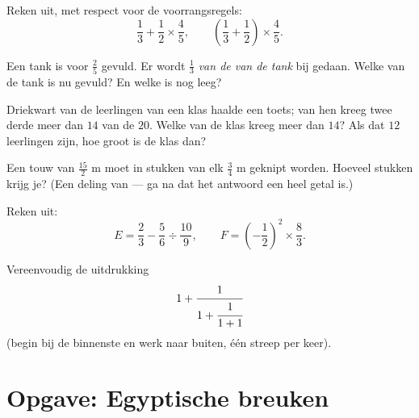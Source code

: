 \begin{exercise}[$\star$]\label{exo:g8:fractions:7}
Reken uit, met respect voor de voorrangsregels:
\[
\frac{1}{3} + \frac{1}{2} \times \frac{4}{5},
\qquad
\left(\frac{1}{3} + \frac{1}{2}\right) \times \frac{4}{5} .
\]
\end{exercise}

\begin{exercise}[$\star\star$]\label{exo:g8:fractions:8}
Een tank is voor $\frac{2}{5}$ gevuld. Er wordt $\frac{1}{3}$ \emph{van de  van
de tank} bij gedaan. Welke  van de tank is nu gevuld? En welke  is nog
leeg?
\end{exercise}

\begin{exercise}[$\star\star$]\label{exo:g8:fractions:9}
Driekwart van de leerlingen van een klas haalde een toets; van hen kreeg twee derde
meer dan $14$ van de $20$. Welke  van de klas kreeg meer dan $14$? Als dat $12$
leerlingen zijn, hoe groot is de klas dan?
\end{exercise}

\begin{exercise}[$\star\star$]\label{exo:g8:fractions:10}
Een touw van $\frac{15}{2}$ m moet in stukken van elk $\frac{3}{4}$ m geknipt worden.
Hoeveel stukken krijg je? (Een deling van  --- ga na dat het antwoord een heel
getal is.)
\end{exercise}

\begin{exercise}[$\star\star$]\label{exo:g8:fractions:11}
Reken uit:
\[
E = \frac{2}{3} - \frac{5}{6} \div \frac{10}{9},
\qquad
F = \left(-\frac{1}{2}\right)^2 \times \frac{8}{3} .
\]
\end{exercise}

\begin{exercise}[$\star\star\star$]\label{exo:g8:fractions:12}
Vereenvoudig de uitdrukking
\[
1 + \cfrac{1}{1 + \cfrac{1}{1 + 1}}
\]
(begin bij de binnenste  en werk naar buiten, één streep per keer).
\end{exercise}

\section{Opgave: Egyptische breuken}

